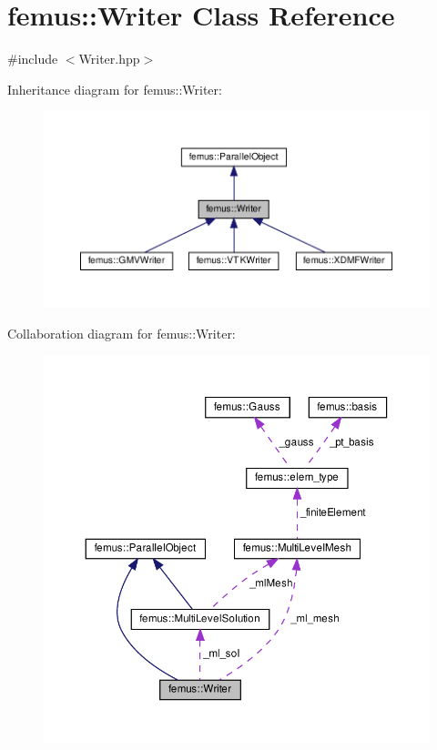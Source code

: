 \hypertarget{classfemus_1_1_writer}{}\section{femus\+:\+:Writer Class Reference}
\label{classfemus_1_1_writer}


{\ttfamily \#include $<$Writer.\+hpp$>$}



Inheritance diagram for femus\+:\+:Writer\+:
\nopagebreak
\begin{figure}[H]
\begin{center}
\leavevmode
\includegraphics[width=350pt]{classfemus_1_1_writer__inherit__graph}
\end{center}
\end{figure}


Collaboration diagram for femus\+:\+:Writer\+:
\nopagebreak
\begin{figure}[H]
\begin{center}
\leavevmode
\includegraphics[width=350pt]{classfemus_1_1_writer__coll__graph}
\end{center}
\end{figure}

